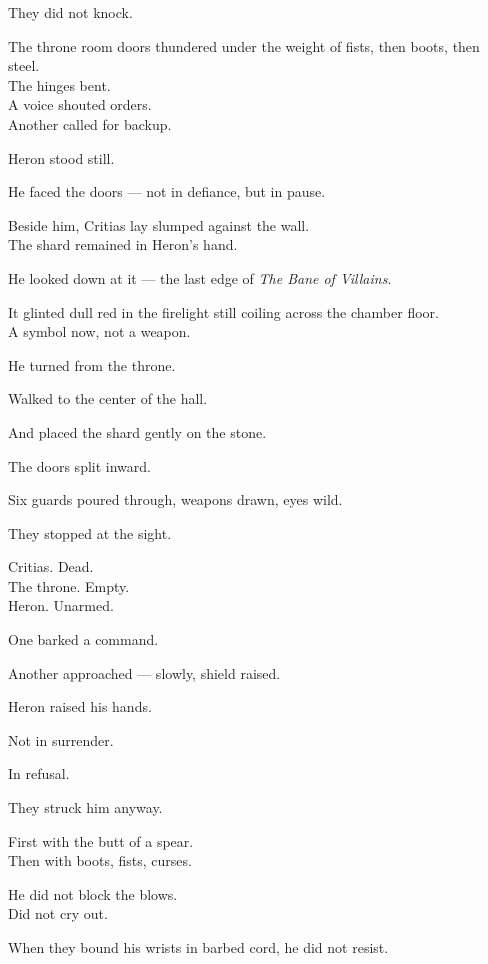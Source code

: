 \documentclass[9pt]{article}
\begin{document}
They did not knock.

The throne room doors thundered under the weight of fists, then boots, then steel.\\
The hinges bent.\\
A voice shouted orders.\\
Another called for backup.

Heron stood still.

He faced the doors — not in defiance, but in pause.

Beside him, Critias lay slumped against the wall.\\
The shard remained in Heron’s hand.

\vspace{1em}

He looked down at it — the last edge of \textit{The Bane of Villains}.

It glinted dull red in the firelight still coiling across the chamber floor.\\
A symbol now, not a weapon.

He turned from the throne.

Walked to the center of the hall.

And placed the shard gently on the stone.

\vspace{1em}

The doors split inward.

Six guards poured through, weapons drawn, eyes wild.

They stopped at the sight.

Critias. Dead.\\
The throne. Empty.\\
Heron. Unarmed.

One barked a command.

Another approached — slowly, shield raised.

Heron raised his hands.

Not in surrender.

In refusal.

\vspace{1em}

They struck him anyway.

First with the butt of a spear.\\
Then with boots, fists, curses.

He did not block the blows.\\
Did not cry out.

When they bound his wrists in barbed cord, he did not resist.
\end{document}
